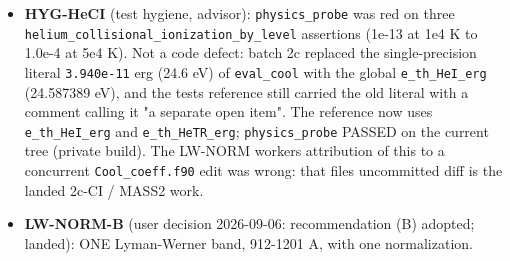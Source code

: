 \documentclass[english,a4paper]{my_memo}
\begin{document}
\begin{itemize}
  probe gains two assertions and a photon-conservation diagnostic (9/9);
  \texttt{fuv\_band\_ledger/run.sh} comment. Advisor follow-up: the table\textquotesingle s generator
  inputs (nine \texttt{abs\_T\#\#\#\#.npz}, 27 CLOUDY rate files, the line-by-line
  scripts, the Meudon level and line data, 29 MB) moved from the 2026-09-03
  scratch directory into \texttt{src/utils/h2\_shielding\_lbl/} with a README, and
  \texttt{h2\_shielding\_table\_line\_by\_line.py}\textquotesingle s template brought in line with the
  hand-renamed \texttt{axis} dummy of \texttt{h2\_shield\_locate}: the generator now
  reproduces the shipped module BYTE FOR BYTE (MEASURED). The repair, table
  on 912-1110 A or beam widened to 912-1200 A with the B1 flux joined, is
  item 6 of \texttt{To\_be\_determined\_by\_user\_20260906.md} (recommendation: widen),
  because the second redefines the \texttt{Stellar\ LW\ flux} key. Still to correct
  after B3c releases \texttt{write\_output.f90}: the ledger\textquotesingle s LW label says "two
  fits" and should say "two bands" (with the \texttt{header\_names\_lw\_fits}
  assertion of \texttt{fuv\_band\_ledger}).
\item
  \textbf{HYG-HeCI} (test hygiene, advisor): \texttt{physics\_probe} was red on three
  \texttt{helium\_collisional\_ionization\_by\_level} assertions (1e-13 at 1e4 K to
  1.0e-4 at 5e4 K). Not a code defect: batch 2c replaced the single-precision
  literal \texttt{3.940e-11} erg (24.6 eV) of \texttt{eval\_cool} with the global
  \texttt{e\_th\_HeI\_erg} (24.587389 eV), and the test\textquotesingle s reference still carried the
  old literal with a comment calling it "a separate open item". The reference
  now uses \texttt{e\_th\_HeI\_erg} and \texttt{e\_th\_HeTR\_erg}; \texttt{physics\_probe} PASSED on the
  current tree (private build). The LW-NORM worker\textquotesingle s attribution of this to
  a concurrent \texttt{Cool\_coeff.f90} edit was wrong: that file\textquotesingle s uncommitted diff
  is the landed 2c-CI / MASS2 work.
\item
  \textbf{LW-NORM-B} (user decision 2026-09-06: recommendation (B) adopted;
  landed): ONE Lyman-Werner band, 912-1201 A, with one normalization.


\end{itemize}
\end{document}
